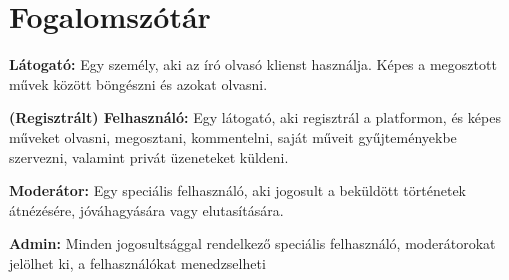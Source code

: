 \section{Fogalomszótár}
\textbf{Látogató:} Egy személy, aki az író olvasó klienst használja. Képes a megosztott művek között böngészni és azokat olvasni. 

\textbf{(Regisztrált) Felhasználó:} Egy látogató, aki regisztrál a platformon, és képes műveket olvasni, megosztani, kommentelni, saját műveit gyűjteményekbe szervezni, valamint privát üzeneteket küldeni.

\textbf{Moderátor:} Egy speciális felhasználó, aki jogosult a beküldött történetek átnézésére, jóváhagyására vagy elutasítására.

\textbf{Admin:} Minden jogosultsággal rendelkező speciális felhasználó, moderátorokat jelölhet ki, a felhasználókat menedzselheti

